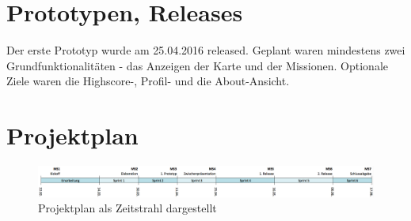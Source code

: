 \section{Prototypen, Releases}
Der erste Prototyp wurde am 25.04.2016 released. 
Geplant waren mindestens zwei Grundfunktionalitäten - das Anzeigen der Karte und der Missionen. 
Optionale Ziele waren die Highscore-, Profil- und die About-Ansicht.




\section{Projektplan}


\begin{figure}[H]
	\centering
	\includegraphics[width=\textwidth]{images/projektmanagement/zeitstrahl.png}
	\caption{Projektplan als Zeitstrahl dargestellt}
	\label{image-project-plan-timeline}
\end{figure}

